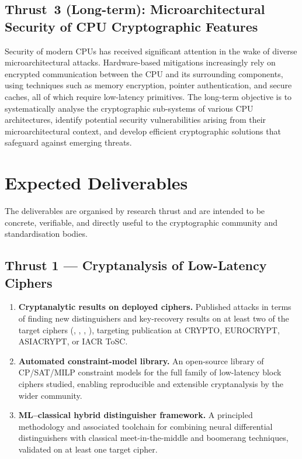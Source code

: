 \subsection{Thrust~3 (Long-term): Microarchitectural Security of CPU Cryptographic Features}

Security of modern CPUs has received significant attention in the wake of diverse microarchitectural attacks.
Hardware-based mitigations increasingly rely on encrypted communication between the CPU and its surrounding components, using techniques such as memory encryption, pointer authentication, and secure caches, all of which require low-latency primitives.
The long-term objective is to systematically analyse the cryptographic sub-systems of various CPU architectures, identify potential security vulnerabilities arising from their microarchitectural context, and develop efficient cryptographic solutions that safeguard against emerging threats.

\section{Expected Deliverables}

The deliverables are organised by research thrust and are intended to be concrete, verifiable, and directly useful to the cryptographic community and standardisation bodies.

\subsection*{Thrust 1 — Cryptanalysis of Low-Latency Ciphers}
\begin{enumerate}[label=\textbf{D\arabic*.}, leftmargin=*, itemsep=2pt]
  \item \textbf{Cryptanalytic results on deployed ciphers.}
        Published attacks in terms of finding new distinguishers and key-recovery results on at least two of the target ciphers (, , , ), targeting publication at CRYPTO, EUROCRYPT, ASIACRYPT, or IACR ToSC.

  \item \textbf{Automated constraint-model library.}
        An open-source library of CP/SAT/MILP constraint models for the full family of low-latency block ciphers studied, enabling reproducible and extensible cryptanalysis by the wider community.

  \item \textbf{ML--classical hybrid distinguisher framework.}
        A principled methodology and associated toolchain for combining neural differential distinguishers with classical meet-in-the-middle and boomerang techniques, validated on at least one target cipher.
\end{enumerate}


